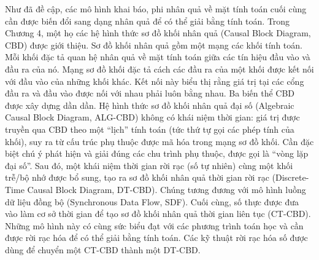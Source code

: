 Như đã đề cập, các mô hình khai báo, phi nhân quả về mặt tính toán cuối cùng cần được biến đổi sang dạng nhân quả để có thể giải bằng tính toán. Trong Chương 4, một họ các hệ hình thức sơ đồ khối nhân quả (Causal Block Diagram, CBD) được giới thiệu. Sơ đồ khối nhân quả gồm một mạng các khối tính toán. Mỗi khối đặc tả quan hệ nhân quả về mặt tính toán giữa các tín hiệu đầu vào và đầu ra của nó. Mạng sơ đồ khối đặc tả cách các đầu ra của một khối được kết nối với đầu vào của những khối khác. Kết nối này biểu thị rằng giá trị tại các cổng đầu ra và đầu vào được nối với nhau phải luôn bằng nhau. Ba biến thể CBD được xây dựng
dần dần. Hệ hình thức sơ đồ khối nhân quả đại số (Algebraic Causal Block Diagram, ALG-CBD) không có khái niệm thời gian: giá trị được truyền qua CBD theo một ``lịch'' tính toán (tức thứ tự gọi các phép tính của khối), suy ra từ cấu trúc phụ thuộc được mã hóa trong mạng sơ đồ khối. Cần đặc biệt chú ý phát hiện và giải đúng các chu trình phụ thuộc, được gọi là ``vòng lặp đại số''. Sau đó, một khái niệm thời gian rời rạc (số tự nhiên) cùng một khối trễ/bộ nhớ được bổ sung, tạo ra sơ đồ khối nhân quả thời gian rời rạc (Discrete-Time Causal Block Diagram, DT-CBD). Chúng tương đương với mô hình luồng dữ liệu đồng bộ (Synchronous Data Flow, SDF). Cuối cùng, số thực được đưa vào làm cơ sở thời gian để tạo sơ đồ khối nhân quả thời gian liên tục (CT-CBD). Những mô hình này có cùng sức biểu đạt với các phương trình toán học và cần được rời rạc hóa để có thể giải bằng tính toán. Các kỹ thuật rời rạc hóa số được dùng để chuyển một CT-CBD thành một DT-CBD.

